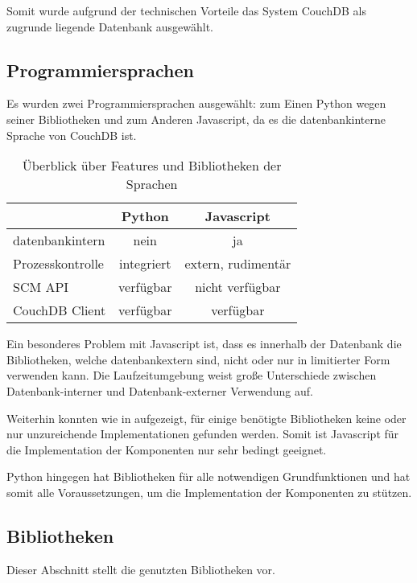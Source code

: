 Somit wurde aufgrund der technischen Vorteile das System CouchDB als zugrunde liegende Datenbank ausgewählt.

\subsection{Programmiersprachen}

Es wurden zwei Programmiersprachen ausgew\"ahlt:
zum Einen Python wegen seiner Bibliotheken und
zum Anderen Javascript, da es die datenbankinterne Sprache von CouchDB ist.

\begin{table}[ht]
\centering
\begin{tabular}{l|c|c}
                            & \textbf{Python} & \textbf{Javascript} \\
    \hline
    datenbankintern         & nein            & ja \\
    Prozesskontrolle        & integriert      & extern, rudimentär \\
    SCM API                & verfügbar       & nicht verfügbar \\
    CouchDB Client          & verfügbar       & verfügbar \\
\end{tabular}
\caption{Überblick über Features und Bibliotheken der Sprachen}
\label{tab:python-vs-js}
\end{table}

Ein besonderes Problem mit Javascript ist,
dass es innerhalb der Datenbank die Bibliotheken, welche datenbankextern sind,
nicht oder nur in limitierter Form verwenden kann.
Die Laufzeitumgebung weist große Unterschiede
zwischen Datenbank-interner und Datenbank-externer Verwendung auf.

Weiterhin konnten wie in  aufgezeigt,
für einige benötigte Bibliotheken keine
oder nur unzureichende Implementationen gefunden werden.
Somit ist Javascript für die Implementation der Komponenten
nur sehr bedingt geeignet.

Python hingegen hat Bibliotheken für alle notwendigen Grundfunktionen
und hat somit alle Voraussetzungen,
um die Implementation der Komponenten zu stützen.

\subsection{Bibliotheken}

Dieser Abschnitt stellt die genutzten Bibliotheken vor.


